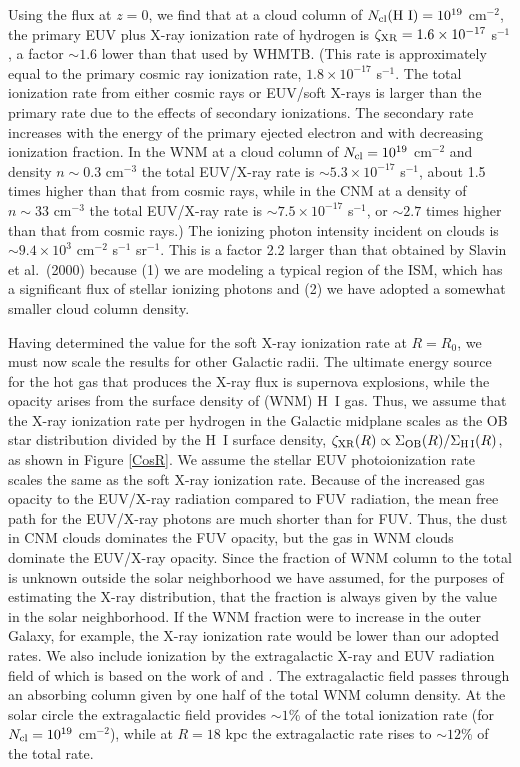 \documentclass[12pt,preprint,flushrt]{aastex}
\begin{document}
Using the flux at $z=0$, we find that
at a cloud column of $N_{\rm cl}({\rm H~I})=10^{19}$ cm$^{-2}$,
the primary EUV plus X-ray ionization rate of hydrogen is
$\zeta_{\rm XR} = 1.6\times
10^{-17}$ s$^{-1}$, a factor $\sim 1.6$ lower than that used by WHMTB.
(This rate is approximately equal to the primary cosmic ray
ionization rate, $1.8\times 10^{-17}$ s$^{-1}$. The total
ionization rate from either cosmic rays or EUV/soft X-rays is larger
than the primary rate due to the effects of secondary ionizations.
The secondary rate increases with the energy of the primary ejected 
electron and with decreasing ionization fraction. 
In the WNM at a cloud column of
$N_{\rm cl} = 10^{19}$ cm$^{-2}$ and density $n\sim 0.3$ cm$^{-3}$
the total EUV/X-ray rate is $\sim 5.3\times 10^{-17}$ s$^{-1}$,
about 1.5 times higher than that from 
cosmic rays, while in the CNM at a density of $n\sim 33$ cm$^{-3}$ 
the total EUV/X-ray rate is $\sim 7.5\times 10^{-17}$ s$^{-1}$,
or $\sim 2.7$ times higher than that from cosmic rays.)
The ionizing photon intensity incident on clouds is $\sim 9.4 \times 10^3$
cm$^{-2}$ s$^{-1}$ sr$^{-1}$.
This is a factor 2.2 larger than that obtained
by Slavin et al.\ (2000) because (1) we are modeling
a typical region of the ISM, which has a significant flux
of stellar ionizing photons and (2) we have adopted
a somewhat smaller cloud column density.

Having determined the value for the soft X-ray ionization rate at $R=R_0$,
we must now scale the results for other Galactic radii. The ultimate
energy source for the
hot gas that produces the X-ray flux is supernova explosions, while the
opacity arises from the surface density of (WNM) H~I gas.
Thus, we assume that the X-ray ionization rate per hydrogen in the
Galactic midplane scales as the OB star
distribution divided by the H~I surface density,
$\zeta_{\rm XR}(R)\propto \Sigma_{\rm OB}(R)/\Sigma_{\rm H\,I}(R)$,
as shown in Figure
\ref{CosR}. We assume the stellar EUV photoionization rate scales
the same as the soft X-ray ionization rate. Because of the increased
gas opacity to the EUV/X-ray radiation compared to FUV radiation,
the mean free path for the EUV/X-ray photons are much shorter
than for FUV. Thus, the dust in CNM clouds dominates the FUV opacity,
but the gas in WNM clouds dominate the EUV/X-ray opacity.
Since the fraction of WNM column to the total is unknown outside
the solar neighborhood we have assumed, for the purposes of estimating
the X-ray distribution, that the fraction is always given by the value in
the solar neighborhood. If the WNM fraction were to increase in the
outer Galaxy, for example, the X-ray ionization rate would be lower than
our adopted rates. We also include ionization by the extragalactic X-ray and
EUV radiation field of \cite{ster02} which is based on the work
of \cite{haa96} and \cite{chen97}. The extragalactic
field passes through an absorbing column given by one half of the total
WNM column density. At the solar circle the extragalactic field provides
$\sim 1$\% of the total ionization rate (for $N_{\rm cl} = 10^{19}$
cm$^{-2}$), while at $R=18$ kpc the extragalactic rate rises to
$\sim 12$\% of the total rate.
\end{document}
